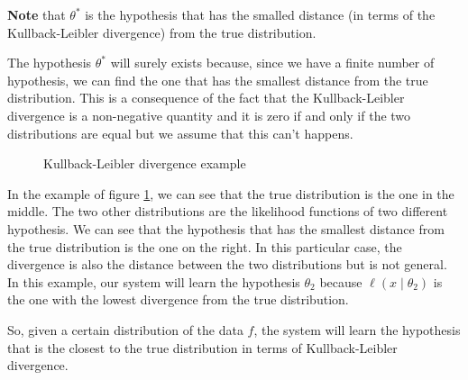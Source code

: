 \textbf{Note} that $\theta^{\ast} $ is the hypothesis that has the smalled distance (in terms of the Kullback-Leibler divergence) from the true distribution.

The hypothesis $\theta^\ast$ will surely exists because, since we have a finite number of hypothesis, we can find the one that has the smallest distance from the true distribution. This is a consequence of the fact that the Kullback-Leibler divergence is a non-negative quantity and it is zero if and only if the two distributions are equal but we assume that this can't happens.

\begin{figure}
    \centering
    \label{fig:klexample}
    \caption{Kullback-Leibler divergence example}
\end{figure}

In the example of figure \ref{fig:klexample}, we can see that the true distribution is the one in the middle. 
The two other distributions are the likelihood functions of two different hypothesis. We can see that the hypothesis that has the smallest distance from the true distribution is the one on the right. In this particular case, the divergence is also the distance between the two distributions but is not general.
In this example, our system will learn the hypothesis $\theta_2$ because $\ell (x \mid \theta_2)$ is the one with the lowest divergence from the true distribution.

So, given a certain distribution of the data $f$, the system will learn the hypothesis that is the closest to the true distribution in terms of Kullback-Leibler divergence.

